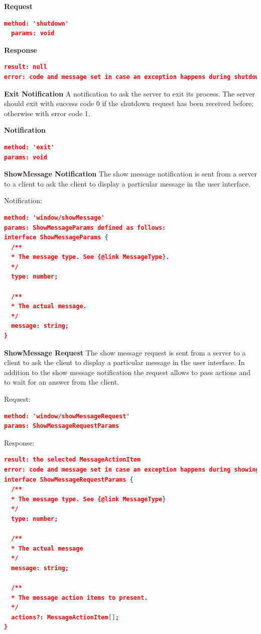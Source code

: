 \textbf{Request}
\begin{lstlisting}[language=json,firstnumber=1]
  method: 'shutdown'
  params: void
\end{lstlisting}
\textbf{Response}
\begin{lstlisting}[language=json,firstnumber=1]
result: null
error: code and message set in case an exception happens during shutdown request.
\end{lstlisting}

\textbf{Exit Notification}
A notification to ask the server to exit its process. The server should exit with success code 0 if the shutdown request has been received before; otherwise with error code 1.

\textbf{Notification}
\begin{lstlisting}[language=json,firstnumber=1]
method: 'exit'
params: void
\end{lstlisting}

\textbf{ShowMessage Notification}
The show message notification is sent from a server to a client to ask the client to display a particular message in the user interface.

Notification:
\begin{lstlisting}[language=json,firstnumber=1]
method: 'window/showMessage'
params: ShowMessageParams defined as follows:
interface ShowMessageParams {
  /**
  * The message type. See {@link MessageType}.
  */
  type: number;
	
  /**
  * The actual message.
  */
  message: string;
}
\end{lstlisting}
\textbf{ShowMessage Request}
The show message request is sent from a server to a client to ask the client to display a particular message in the user interface. In addition to the show message notification the request allows to pass actions and to wait for an answer from the client.

Request:
\begin{lstlisting}[language=json,firstnumber=1]
method: 'window/showMessageRequest'
params: ShowMessageRequestParams
\end{lstlisting}
Response:
\begin{lstlisting}[language=json,firstnumber=1]
result: the selected MessageActionItem
error: code and message set in case an exception happens during showing a message.
interface ShowMessageRequestParams {
  /**
  * The message type. See {@link MessageType}
  */
  type: number;
	
  /**
  * The actual message
  */
  message: string;
	
  /**
  * The message action items to present.
  */
  actions?: MessageActionItem[];
}
\end{lstlisting}

